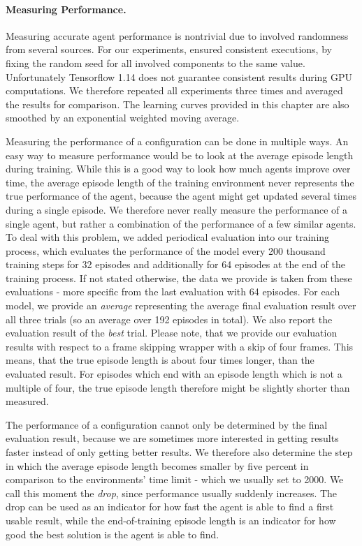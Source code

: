 \paragraph{Measuring Performance.}
Measuring accurate agent performance is nontrivial due to involved randomness from several sources. For our experiments, ensured consistent executions, by fixing the random seed for all involved components to the same value. Unfortunately Tensorflow 1.14 does not guarantee consistent results during GPU computations. We therefore repeated all experiments three times and averaged the results for comparison. The learning curves provided in this chapter are also smoothed by an exponential weighted moving average.

Measuring the performance of a configuration can be done in multiple ways. An easy way to measure performance would be to look at the average episode length during training. While this is a good way to look how much agents improve over time, the average episode length of the training environment never represents the true performance of the agent, because the agent might get updated several times during a single episode. We therefore never really measure the performance of a single agent, but rather a combination of the performance of a few similar agents. To deal with this problem, we added periodical evaluation into our training process, which evaluates the performance of the model every 200 thousand training steps for 32 episodes and additionally for 64 episodes at the end of the training process. If not stated otherwise, the data we provide is taken from these evaluations - more specific from the last evaluation with 64 episodes. For each model, we provide an \textit{average} representing the average final evaluation result over all three trials (so an average over 192 episodes in total). We also report the evaluation result of the \textit{best} trial. Please note, that we provide our evaluation results with respect to a frame skipping wrapper with a skip of four frames. This means, that the true episode length is about four times longer, than the evaluated result. For episodes which end with an episode length which is not a multiple of four, the true episode length therefore might be slightly shorter than measured.

The performance of a configuration cannot only be determined by the final evaluation result, because we are sometimes more interested in getting results faster instead of only getting better results. We therefore also determine the step in which the average episode length becomes smaller by five percent in comparison to the environments' time limit - which we usually set to 2000. We call this moment the \textit{drop}, since performance usually suddenly increases. The drop can be used as an indicator for how fast the agent is able to find a first usable result, while the end-of-training episode length is an indicator for how good the best solution is the agent is able to find. 

